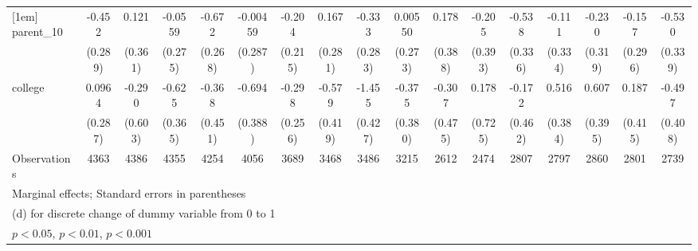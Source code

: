 {\begin{tabular}{l*{16}{c}}
[1em]
parent\_10           &      -0.452         &       0.121         &     -0.0559         &      -0.672\sym{*}  &    -0.00459         &      -0.204         &       0.167         &      -0.333         &     0.00550         &       0.178         &      -0.205         &      -0.538         &      -0.111         &      -0.230         &      -0.157         &      -0.530         \\
                    &     (0.289)         &     (0.361)         &     (0.275)         &     (0.268)         &     (0.287)         &     (0.215)         &     (0.281)         &     (0.283)         &     (0.273)         &     (0.388)         &     (0.393)         &     (0.336)         &     (0.334)         &     (0.319)         &     (0.296)         &     (0.339)         \\
[1em]
college             &      0.0964         &      -0.290         &      -0.625         &      -0.368         &      -0.694         &      -0.298         &      -0.579         &      -1.455\sym{***}&      -0.375         &      -0.307         &       0.178         &      -0.172         &       0.516         &       0.607         &       0.187         &      -0.497         \\
                    &     (0.287)         &     (0.603)         &     (0.365)         &     (0.451)         &     (0.388)         &     (0.256)         &     (0.419)         &     (0.427)         &     (0.380)         &     (0.475)         &     (0.725)         &     (0.462)         &     (0.384)         &     (0.395)         &     (0.415)         &     (0.408)         \\
\hline
Observations        &        4363         &        4386         &        4355         &        4254         &        4056         &        3689         &        3468         &        3486         &        3215         &        2612         &        2474         &        2807         &        2797         &        2860         &        2801         &        2739         \\
\hline\hline
\multicolumn{17}{l}{\footnotesize Marginal effects; Standard errors in parentheses}\\
\multicolumn{17}{l}{\footnotesize  (d) for discrete change of dummy variable from 0 to 1}\\
\multicolumn{17}{l}{\footnotesize \sym{*} \(p<0.05\), \sym{**} \(p<0.01\), \sym{***} \(p<0.001\)}\\
\end{tabular}
}

